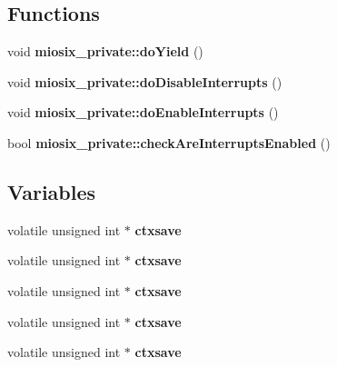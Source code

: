 \subsection*{Functions}
\begin{DoxyCompactItemize}
\item 
\hypertarget{group___drivers_gabde377c6777ad3f4aecde34ee1e26df4}{void {\bfseries miosix\-\_\-private\-::do\-Yield} ()}\label{group___drivers_gabde377c6777ad3f4aecde34ee1e26df4}

\item 
\hypertarget{group___drivers_ga961407a501c1247188dcdf5f60e8f301}{void {\bfseries miosix\-\_\-private\-::do\-Disable\-Interrupts} ()}\label{group___drivers_ga961407a501c1247188dcdf5f60e8f301}

\item 
\hypertarget{group___drivers_ga81e39c3699a44c981d94c17a64722f41}{void {\bfseries miosix\-\_\-private\-::do\-Enable\-Interrupts} ()}\label{group___drivers_ga81e39c3699a44c981d94c17a64722f41}

\item 
\hypertarget{group___drivers_ga392ef99b87ee6feb2805dee3790f9648}{bool {\bfseries miosix\-\_\-private\-::check\-Are\-Interrupts\-Enabled} ()}\label{group___drivers_ga392ef99b87ee6feb2805dee3790f9648}

\end{DoxyCompactItemize}
\subsection*{Variables}
\begin{DoxyCompactItemize}
\item 
\hypertarget{group___drivers_ga8a5f91e2c91d35597d0f7ba85f99898b}{volatile unsigned int $\ast$ {\bfseries ctxsave}}\label{group___drivers_ga8a5f91e2c91d35597d0f7ba85f99898b}

\item 
\hypertarget{group___drivers_ga8a5f91e2c91d35597d0f7ba85f99898b}{volatile unsigned int $\ast$ {\bfseries ctxsave}}\label{group___drivers_ga8a5f91e2c91d35597d0f7ba85f99898b}

\item 
\hypertarget{group___drivers_ga8a5f91e2c91d35597d0f7ba85f99898b}{volatile unsigned int $\ast$ {\bfseries ctxsave}}\label{group___drivers_ga8a5f91e2c91d35597d0f7ba85f99898b}

\item 
\hypertarget{group___drivers_ga8a5f91e2c91d35597d0f7ba85f99898b}{volatile unsigned int $\ast$ {\bfseries ctxsave}}\label{group___drivers_ga8a5f91e2c91d35597d0f7ba85f99898b}

\item 
\hypertarget{group___drivers_ga8a5f91e2c91d35597d0f7ba85f99898b}{volatile unsigned int $\ast$ {\bfseries ctxsave}}\label{group___drivers_ga8a5f91e2c91d35597d0f7ba85f99898b}

\end{DoxyCompactItemize}


